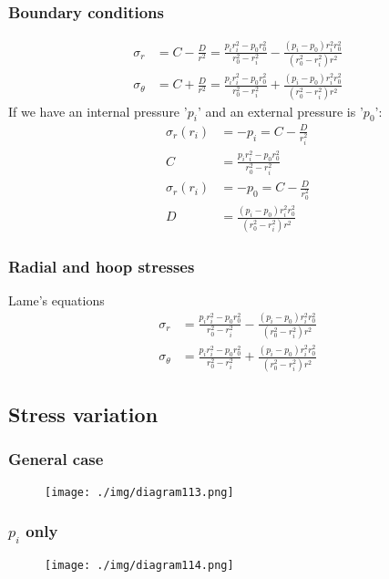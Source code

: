 \subsubsection{Boundary conditions}
\begin{align}
  \sigma_r        & = C - \frac{D}{r^2} = \frac{p_i r_i^2 - p_0r_0^2}{r_0^2 - r_i^2} - \frac{\left(p_i-p_0\right)r_i^2r_0^2}{\left(r_0^2-r_i^2\right)r^2} \\
  \sigma_{\theta} & = C + \frac{D}{r^2} = \frac{p_i r_i^2 - p_0r_0^2}{r_0^2 - r_i^2} + \frac{\left(p_i-p_0\right)r_i^2r_0^2}{\left(r_0^2-r_i^2\right)r^2}
\end{align}
If we have an internal pressure '$p_i$' and an external pressure is '$p_0$':
\begin{align}
  \sigma_r\left(r_i\right) & = -p_i = C - \frac{D}{r_i^2}                                         \\
  C                        & = \frac{p_i r_i^2 - p_0r_0^2}{r_0^2 - r_i^2}                         \\
  \sigma_r\left(r_i\right) & = -p_0 = C - \frac{D}{r_0^2}                                         \\
  D                        & = \frac{\left(p_i-p_0\right)r_i^2r_0^2}{\left(r_0^2-r_i^2\right)r^2}
\end{align}
\subsubsection{Radial and hoop stresses}
Lame's equations
\begin{align}
  \sigma_r        & = \frac{p_i r_i^2 - p_0r_0^2}{r_0^2 - r_i^2} - \frac{\left(p_i-p_0\right)r_i^2r_0^2}{\left(r_0^2-r_i^2\right)r^2} \\
  \sigma_{\theta} & = \frac{p_i r_i^2 - p_0r_0^2}{r_0^2 - r_i^2} + \frac{\left(p_i-p_0\right)r_i^2r_0^2}{\left(r_0^2-r_i^2\right)r^2}
\end{align}
\subsection{Stress variation}
\subsubsection{General case}
\begin{figure}[H]
  \centering
  \texttt{[image: ./img/diagram113.png]}
  \caption{}
\end{figure}
\subsubsection{$p_i$ only}
\begin{figure}[H]
  \centering
  \texttt{[image: ./img/diagram114.png]}
  \caption{}
\end{figure}

